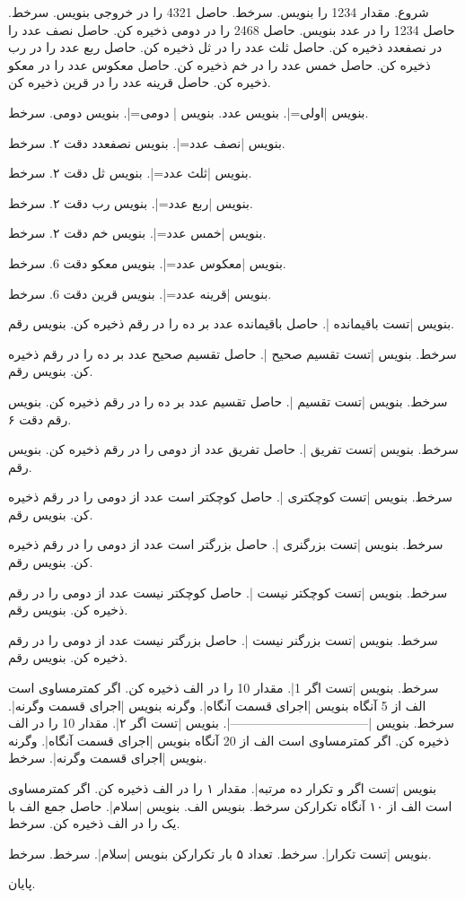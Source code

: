 شروع.
مقدار 1234 را بنویس.
سرخط.
حاصل 4321 را در خروجی بنویس.
سرخط.
حاصل 1234 را در عدد بنویس.
حاصل 2468 را در دومی ذخیره کن.
حاصل نصف عدد را در نصفعدد ذخیره کن.
حاصل ثلث عدد را در ثل ذخیره کن.
حاصل ربع عدد را در رب ذخیره کن.
حاصل خمس عدد را در خم ذخیره کن.
حاصل معکوس عدد را در معکو ذخیره کن.
حاصل قرینه عدد را در قرین ذخیره کن.

بنویس |اولی=|.
بنویس عدد.
بنویس | دومی=|.
بنویس دومی.
سرخط.

بنویس |نصف عدد=|.
بنویس نصفعدد دقت ۲.
سرخط.

بنویس |ثلث عدد=|.
بنویس ثل  دقت ۲.
سرخط.

بنویس |ربع عدد=|.
بنویس رب  دقت ۲.
سرخط.

بنویس |خمس عدد=|.
بنویس خم  دقت ۲.
سرخط.

بنویس |معکوس عدد=|.
بنویس معکو  دقت 6.
سرخط.

بنویس |قرینه عدد=|.
بنویس قرین  دقت 6.
سرخط.


بنویس |تست باقیمانده |.
حاصل باقیمانده عدد بر ده را در رقم ذخیره کن.
بنویس رقم.

سرخط.
بنویس |تست تقسیم صحیح |.
حاصل تقسیم صحیح عدد بر ده را در رقم ذخیره کن.
بنویس رقم.

سرخط.
بنویس |تست تقسیم |.
حاصل تقسیم عدد بر ده را در رقم ذخیره کن.
بنویس رقم دقت ۶.

سرخط.
بنویس |تست تفریق |.
حاصل تفریق عدد از دومی را در رقم ذخیره کن.
بنویس رقم.

سرخط.
بنویس |تست کوچکتری |.
حاصل کوچکتر است عدد از دومی را در رقم ذخیره کن.
بنویس رقم.

سرخط.
بنویس |تست بزرگنری |.
حاصل بزرگتر است عدد از دومی را در رقم ذخیره کن.
بنویس رقم.

سرخط.
بنویس |تست کوچکتر نیست |.
حاصل کوچکتر نیست عدد از دومی را در رقم ذخیره کن.
بنویس رقم.

سرخط.
بنویس |تست بزرگنر نیست |.
حاصل بزرگتر نیست عدد از دومی را در رقم ذخیره کن.
بنویس رقم.

سرخط.
بنویس |تست اگر 1\n|.
مقدار 10 را در الف ذخیره کن.
اگر کمترمساوی است الف از 5 آنگاه بنویس |اجرای قسمت آنگاه|. وگرنه بنویس |اجرای قسمت وگرنه|.
سرخط.
بنویس |---------------------------------\n|.
بنویس |تست اگر ۲\n|.
مقدار 10 را در الف ذخیره کن.
اگر کمترمساوی است الف از 20 آنگاه بنویس |اجرای قسمت آنگاه|. وگرنه بنویس |اجرای قسمت وگرنه|.
سرخط.


بنویس |تست اگر و تکرار ده مرتبه|.
مقدار ۱ را در الف ذخیره کن.
اگر کمترمساوی است الف از ۱۰ آنگاه تکرارکن {
       سرخط.
       بنویس الف.
       بنویس |سلام|.
	 حاصل جمع الف با یک را در الف ذخیره کن.
}
سرخط.


بنویس |تست تکرار|.
  سرخط.
تعداد ۵ بار تکرارکن {
  بنویس |سلام|.
  سرخط.
}
سرخط.

پایان.
